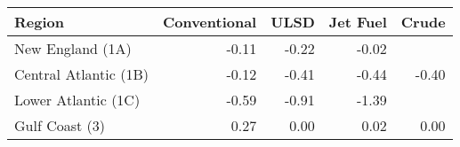 \begin{tabular}{lrrrr}
  \hline
Region & Conventional & ULSD & Jet Fuel & Crude \\ 
  \hline
New England (1A) & -0.11 & -0.22 & -0.02 &  \\ 
  Central Atlantic (1B) & -0.12 & -0.41 & -0.44 & -0.40 \\ 
  Lower Atlantic (1C) & -0.59 & -0.91 & -1.39 &  \\ 
  Gulf Coast (3) & 0.27 & 0.00 & 0.02 & 0.00 \\ 
   \hline
\end{tabular}
